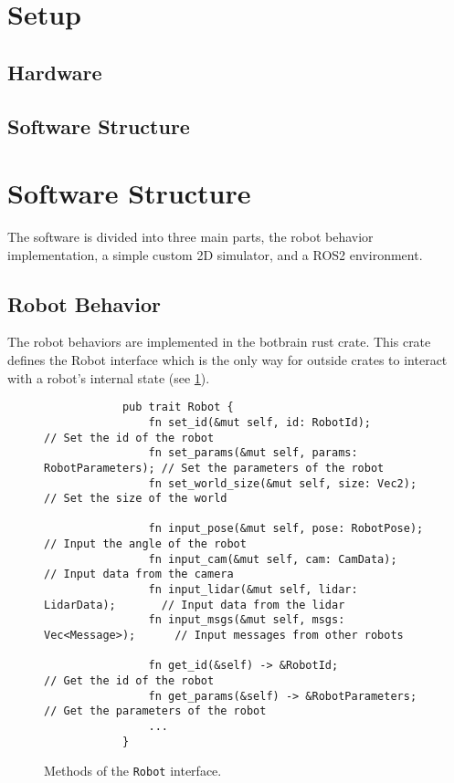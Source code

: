 \section{Setup}
\label{sec:setup}

\subsection{Hardware}

\subsection{Software Structure}

\section{Software Structure}
The software is divided into three main parts, the robot behavior implementation, a simple custom 2D
simulator, and a ROS2 environment.

\subsection{Robot Behavior}
The robot behaviors are implemented in the botbrain rust crate. This crate defines the Robot interface
which is the only way for outside crates to interact with a robot’s internal state (see \cref{fig:robot-interface}).

\begin{figure}[H]
    \begin{center}
        \begin{verbatim}
            pub trait Robot {
                fn set_id(&mut self, id: RobotId);                 // Set the id of the robot
                fn set_params(&mut self, params: RobotParameters); // Set the parameters of the robot
                fn set_world_size(&mut self, size: Vec2);          // Set the size of the world

                fn input_pose(&mut self, pose: RobotPose);         // Input the angle of the robot
                fn input_cam(&mut self, cam: CamData);             // Input data from the camera
                fn input_lidar(&mut self, lidar: LidarData);       // Input data from the lidar
                fn input_msgs(&mut self, msgs: Vec<Message>);      // Input messages from other robots

                fn get_id(&self) -> &RobotId;                      // Get the id of the robot
                fn get_params(&self) -> &RobotParameters;          // Get the parameters of the robot
                ...
            }
        \end{verbatim}
    \end{center}
    \caption{Methods of the \texttt{Robot} interface.}\label{fig:robot-interface}
\end{figure}


